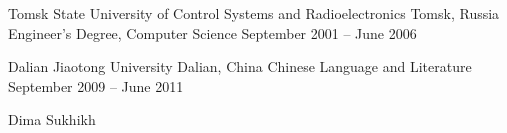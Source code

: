 \documentclass[11pt]{resume}
\begin{document}

\begin{cventries}

\cventry
  {Tomsk State University of Control Systems and Radioelectronics}
  {Tomsk, Russia}
  {Engineer’s Degree, Computer Science}
  {September 2001 – June 2006}
  { }

\cventry
  {Dalian Jiaotong University}
  {Dalian, China}
  {Chinese Language and Literature}
  {September 2009 – June 2011}
  { }

\end{cventries}

\makecvfooter
{Dima Sukhikh}
{\thepage}
{\pageref{LastPage}}
\end{document}
